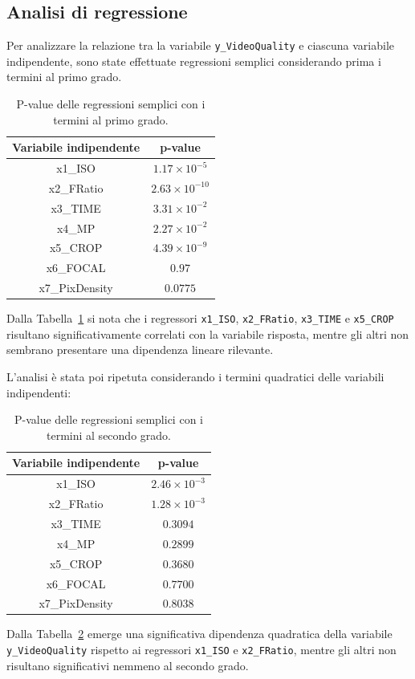 \subsection{Analisi di regressione}
Per analizzare la relazione tra la variabile \texttt{y\_VideoQuality} e ciascuna variabile indipendente, sono state effettuate regressioni semplici considerando prima i termini al primo grado.

\begin{table}[H]
	\centering
	\begin{tabular}{|c|c|}
		\hline
		\textbf{Variabile indipendente} & \textbf{p-value} \\
		\hline
		x1\_ISO & $1.17 \times 10^{-5}$ \\
		\hline
		x2\_FRatio & $2.63 \times 10^{-10}$ \\ 
		\hline
		x3\_TIME & $3.31 \times 10^{-2}$ \\
		\hline
		x4\_MP & $2.27 \times 10^{-2}$ \\
		\hline
		x5\_CROP & $4.39 \times 10^{-9}$ \\
		\hline
		x6\_FOCAL & $0.97$ \\
		\hline
		x7\_PixDensity & $0.0775$ \\
		\hline
	\end{tabular}
	\caption{P-value delle regressioni semplici con i termini al primo grado.}
	\label{tab:reg_lin_1grado}
\end{table}

Dalla Tabella~\ref{tab:reg_lin_1grado} si nota che i regressori \texttt{x1\_ISO}, \texttt{x2\_FRatio}, \texttt{x3\_TIME} e \texttt{x5\_CROP} risultano significativamente correlati con la variabile risposta, mentre gli altri non sembrano presentare una dipendenza lineare rilevante.

L’analisi è stata poi ripetuta considerando i termini quadratici delle variabili indipendenti:

\begin{table}[H]
	\centering
	\begin{tabular}{|c|c|}
		\hline
		\textbf{Variabile indipendente} & \textbf{p-value} \\
		\hline
		x1\_ISO & $2.46 \times 10^{-3}$ \\
		\hline
		x2\_FRatio & $1.28 \times 10^{-3}$ \\ 
		\hline
		x3\_TIME & $0.3094$ \\
		\hline
		x4\_MP & $0.2899$ \\
		\hline
		x5\_CROP & $0.3680$ \\
		\hline
		x6\_FOCAL & $0.7700$ \\
		\hline
		x7\_PixDensity & $0.8038$ \\
		\hline
	\end{tabular}
	\caption{P-value delle regressioni semplici con i termini al secondo grado.}
	\label{tab:reg_lin_2grado}
\end{table}

Dalla Tabella~\ref{tab:reg_lin_2grado} emerge una significativa dipendenza quadratica della variabile \texttt{y\_VideoQuality} rispetto ai regressori \texttt{x1\_ISO} e \texttt{x2\_FRatio}, mentre gli altri non risultano significativi nemmeno al secondo grado.
